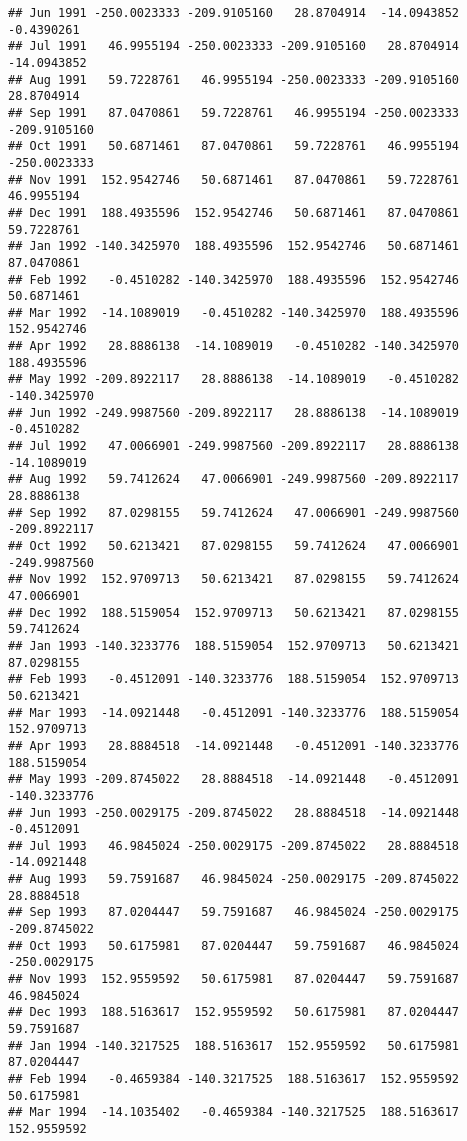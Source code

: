 \documentclass[]{article}
\begin{document}
\begin{verbatim}
## Jun 1991 -250.0023333 -209.9105160   28.8704914  -14.0943852   -0.4390261
## Jul 1991   46.9955194 -250.0023333 -209.9105160   28.8704914  -14.0943852
## Aug 1991   59.7228761   46.9955194 -250.0023333 -209.9105160   28.8704914
## Sep 1991   87.0470861   59.7228761   46.9955194 -250.0023333 -209.9105160
## Oct 1991   50.6871461   87.0470861   59.7228761   46.9955194 -250.0023333
## Nov 1991  152.9542746   50.6871461   87.0470861   59.7228761   46.9955194
## Dec 1991  188.4935596  152.9542746   50.6871461   87.0470861   59.7228761
## Jan 1992 -140.3425970  188.4935596  152.9542746   50.6871461   87.0470861
## Feb 1992   -0.4510282 -140.3425970  188.4935596  152.9542746   50.6871461
## Mar 1992  -14.1089019   -0.4510282 -140.3425970  188.4935596  152.9542746
## Apr 1992   28.8886138  -14.1089019   -0.4510282 -140.3425970  188.4935596
## May 1992 -209.8922117   28.8886138  -14.1089019   -0.4510282 -140.3425970
## Jun 1992 -249.9987560 -209.8922117   28.8886138  -14.1089019   -0.4510282
## Jul 1992   47.0066901 -249.9987560 -209.8922117   28.8886138  -14.1089019
## Aug 1992   59.7412624   47.0066901 -249.9987560 -209.8922117   28.8886138
## Sep 1992   87.0298155   59.7412624   47.0066901 -249.9987560 -209.8922117
## Oct 1992   50.6213421   87.0298155   59.7412624   47.0066901 -249.9987560
## Nov 1992  152.9709713   50.6213421   87.0298155   59.7412624   47.0066901
## Dec 1992  188.5159054  152.9709713   50.6213421   87.0298155   59.7412624
## Jan 1993 -140.3233776  188.5159054  152.9709713   50.6213421   87.0298155
## Feb 1993   -0.4512091 -140.3233776  188.5159054  152.9709713   50.6213421
## Mar 1993  -14.0921448   -0.4512091 -140.3233776  188.5159054  152.9709713
## Apr 1993   28.8884518  -14.0921448   -0.4512091 -140.3233776  188.5159054
## May 1993 -209.8745022   28.8884518  -14.0921448   -0.4512091 -140.3233776
## Jun 1993 -250.0029175 -209.8745022   28.8884518  -14.0921448   -0.4512091
## Jul 1993   46.9845024 -250.0029175 -209.8745022   28.8884518  -14.0921448
## Aug 1993   59.7591687   46.9845024 -250.0029175 -209.8745022   28.8884518
## Sep 1993   87.0204447   59.7591687   46.9845024 -250.0029175 -209.8745022
## Oct 1993   50.6175981   87.0204447   59.7591687   46.9845024 -250.0029175
## Nov 1993  152.9559592   50.6175981   87.0204447   59.7591687   46.9845024
## Dec 1993  188.5163617  152.9559592   50.6175981   87.0204447   59.7591687
## Jan 1994 -140.3217525  188.5163617  152.9559592   50.6175981   87.0204447
## Feb 1994   -0.4659384 -140.3217525  188.5163617  152.9559592   50.6175981
## Mar 1994  -14.1035402   -0.4659384 -140.3217525  188.5163617  152.9559592

\end{verbatim}
\end{document}
